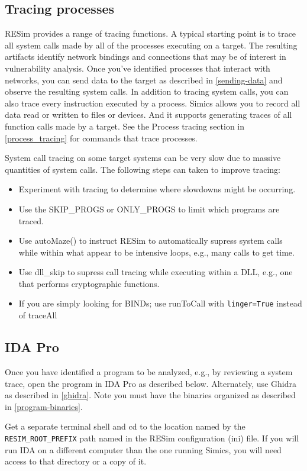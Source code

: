 \documentclass[titlepage]{article}
\begin{document}
\subsection{Tracing processes}
RESim provides a range of tracing functions.  A typical starting point is to trace all system calls made by all of the processes executing on a target.
The resulting artifacts identify network bindings and connections that may be of interest in vulnerability analysis.  Once you've identified processes
that interact with networks, you can send data to the target as described in \ref{sending-data} and observe the resulting system calls.  In addition to 
tracing system calls, you can also trace every instruction executed by a process. Simics allows you to record all data read or written to files or devices.
And it supports generating traces of all function calls made by a target.  See the Process tracing section in \ref{process_tracing} for commands that trace processes.

System call tracing on some target systems can be very slow due to massive quantities of system calls.  The following steps can taken to improve tracing:

\begin{itemize}
\item Experiment with tracing to determine where slowdowns might be occurring.
\item Use the SKIP\_PROGS or ONLY\_PROGS to limit which programs are traced.
\item Use autoMaze() to instruct RESim to automatically supress system calls while within what appear to be intensive loops, e.g., many calls to get time.
\item Use dll\_skip to supress call tracing while executing within a DLL, e.g., one that performs cryptographic functions.
\item If you are simply looking for BINDs; use runToCall with {\tt linger=True} instead of traceAll
\end{itemize}


\subsection{IDA Pro}
\label{ida}
Once you have identified a program to be analyzed, e.g., by reviewing a system trace, open the program in IDA Pro as described below.
Alternately, use Ghidra as described in \ref{ghidra}.  Note you must have the binaries organized as described in \ref{program-binaries}.

Get a separate terminal shell and cd to the location named by the {\tt RESIM\_ROOT\_PREFIX} path named in the RESim configuration (ini) file.  
If you will run IDA on a different computer than the one running Simics, you will need access to that directory or a copy of it.
\end{document}
